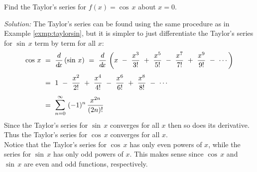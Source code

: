 \begin{exmp}\label{exmp:taylorcos}
\noindent Find the Taylor's series for $f(x)=\cos\,x$ about $x=0$.\vspace{1mm}
\par\noindent\emph{Solution:} The Taylor's series can be found using the same
procedure as in Example \ref{exmp:taylorsin}, but it is simpler to just
differentiate the Taylor's series for $\sin\,x$ term by term for all $x$:
\begin{align*}
\cos\,x ~&=~ \ddx\,(\sin\,x) ~=~
\ddx\,\left(x ~-~ \frac{x^3}{3 !} ~+~ \frac{x^5}{5 !} ~-~ \frac{x^7}{7 !} ~+~
\frac{x^9}{9 !} ~-~ \cdots\right)\\[4pt]
&=~ 1 ~-~ \frac{x^2}{2 !} ~+~ \frac{x^4}{4 !} ~-~ \frac{x^6}{6 !} ~+~
\frac{x^8}{8 !} ~-~ \cdots\\[4pt]
&=~ \bigsum{n=0}{\infty}~ (-1)^{n}\,\frac{x^{2n}}{(2n) !}
\end{align*}
Since the Taylor's series for $\sin\,x$ converges for all $x$ then so does its
derivative. Thus the Taylor's series for $\cos\,x$ converges for all
$x$.\\Notice that the Taylor's series for $\cos\,x$ has only even powers of $x$, while
the series for $\sin\,x$ has only odd powers of $x$. This makes sense since
$\cos\,x$ and $\sin\,x$ are even and odd functions, respectively.
\end{exmp}
\divider
\newpage
